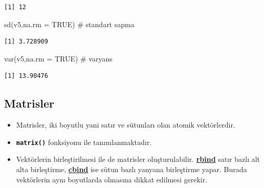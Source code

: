 \documentclass[
  letterpaper,
  DIV=11,
  numbers=noendperiod]{scrreprt}
\newenvironment{Shaded}{\begin{snugshade}}{\end{snugshade}}
\newcommand{\AttributeTok}[1]{\textcolor[rgb]{0.40,0.45,0.13}{#1}}
\newcommand{\CommentTok}[1]{\textcolor[rgb]{0.37,0.37,0.37}{#1}}
\newcommand{\ConstantTok}[1]{\textcolor[rgb]{0.56,0.35,0.01}{#1}}
\newcommand{\FunctionTok}[1]{\textcolor[rgb]{0.28,0.35,0.67}{#1}}
\newcommand{\NormalTok}[1]{\textcolor[rgb]{0.00,0.23,0.31}{#1}}
\begin{document}
\begin{verbatim}
[1] 12
\end{verbatim}

\begin{Shaded}
\begin{Highlighting}[]
\FunctionTok{sd}\NormalTok{(v5,}\AttributeTok{na.rm =} \ConstantTok{TRUE}\NormalTok{) }\CommentTok{\# standart sapma}
\end{Highlighting}
\end{Shaded}

\begin{verbatim}
[1] 3.728909
\end{verbatim}

\begin{Shaded}
\begin{Highlighting}[]
\FunctionTok{var}\NormalTok{(v5,}\AttributeTok{na.rm =} \ConstantTok{TRUE}\NormalTok{) }\CommentTok{\# varyans}
\end{Highlighting}
\end{Shaded}

\begin{verbatim}
[1] 13.90476
\end{verbatim}

\hypertarget{matrisler}{%
\subsection{Matrisler}\label{matrisler}}

\begin{itemize}
\item
  Matrisler, iki boyutlu yani satır ve sütunları olan atomik
  vektörlerdir.
\item
  \textbf{\texttt{matrix()}} fonksiyonu ile tanımlanmaktadır.
\item
  Vektörlerin birleştirilmesi ile de matrisler oluşturulabilir.
  \ul{\textbf{rbind}} satır bazlı alt alta birleştirme,
  \ul{\textbf{cbind}} ise sütun bazlı yanyana birleştirme yapar. Burada
  vektörlerin aynı boyutlarda olmasına dikkat edilmesi gerekir.
\end{itemize}
\end{document}
